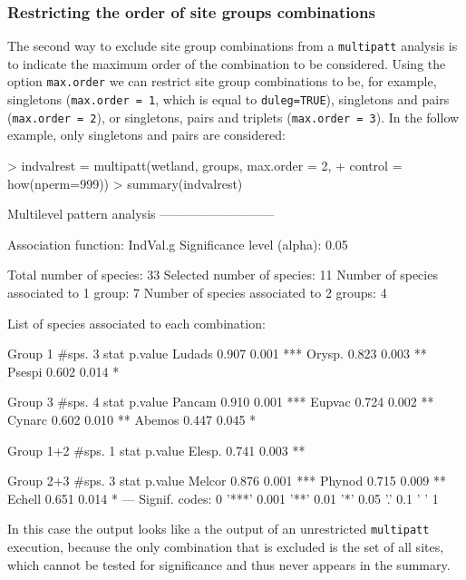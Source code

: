 \documentclass[11pt,a4paper]{article}
\begin{document}
\subsubsection{Restricting the order of site groups combinations}
The second way to exclude site group combinations from a \texttt{multipatt} analysis is to indicate the maximum order of the combination to be considered. Using the option \texttt{max.order} we can restrict site group combinations to be, for example, singletons (\texttt{max.order = 1}, which is equal to \texttt{duleg=TRUE}), singletons and pairs (\texttt{max.order = 2}), or singletons, pairs and triplets (\texttt{max.order = 3}). In the follow example, only singletons and pairs are considered: 
\begin{Schunk}
\begin{Sinput}
> indvalrest = multipatt(wetland, groups, max.order = 2, 
+                        control = how(nperm=999)) 
> summary(indvalrest)
\end{Sinput}
\begin{Soutput}
 Multilevel pattern analysis
 ---------------------------

 Association function: IndVal.g
 Significance level (alpha): 0.05

 Total number of species: 33
 Selected number of species: 11 
 Number of species associated to 1 group: 7 
 Number of species associated to 2 groups: 4 

 List of species associated to each combination: 

 Group 1  #sps.  3 
        stat p.value    
Ludads 0.907   0.001 ***
Orysp. 0.823   0.003 ** 
Psespi 0.602   0.014 *  

 Group 3  #sps.  4 
        stat p.value    
Pancam 0.910   0.001 ***
Eupvac 0.724   0.002 ** 
Cynarc 0.602   0.010 ** 
Abemos 0.447   0.045 *  

 Group 1+2  #sps.  1 
        stat p.value   
Elesp. 0.741   0.003 **

 Group 2+3  #sps.  3 
        stat p.value    
Melcor 0.876   0.001 ***
Phynod 0.715   0.009 ** 
Echell 0.651   0.014 *  
---
Signif. codes:  0 '***' 0.001 '**' 0.01 '*' 0.05 '.' 0.1 ' ' 1 
\end{Soutput}
\end{Schunk}
In this case the output looks like a the output of an unrestricted \texttt{multipatt} execution, because the only combination that is excluded is the set of all sites, which cannot be tested for significance and thus never appears in the summary. 
\end{document}
